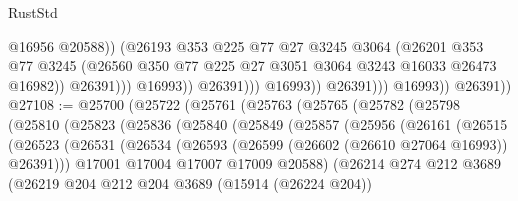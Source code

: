 \begin{lexlean}{RustStd}
\begin{coremodule}
                                        @16956
                                        @20588))
                                    (@26193
                                      @353
                                      @225
                                      @77
                                      @27
                                      @3245
                                      @3064
                                      (@26201
                                        @353
                                        @77
                                        @3245
                                        (@26560
                                          @350
                                          @77
                                          @225
                                          @27
                                          @3051
                                          @3064
                                          @3243
                                          @16033
                                          @26473
                                          @16982))
                                      @26391)))
                                @16993))
                            @26391)))
                      @16993))
                  @26391)))
            @16993))
        @26391))
@27108 := @25700
    (@25722
      (@25761
        (@25763
          (@25765
            (@25782
              (@25798
                (@25810
                  (@25823
                    (@25836
                      (@25840
                        (@25849
                          (@25857
                            (@25956
                              (@26161
                                (@26515
                                  (@26523
                                    (@26531
                                      (@26534
                                        (@26593 (@26599 (@26602 (@26610 @27064 @16993)) @26391)))
                                      @17001
                                      @17004
                                      @17007
                                      @17009
                                      @20588)
                                    (@26214
                                      @274
                                      @212
                                      @3689
                                      (@26219
                                        @204
                                        @212
                                        @204
                                        @3689
                                        (@15914 (@26224 @204))

\end{coremodule}
\end{lexlean}
